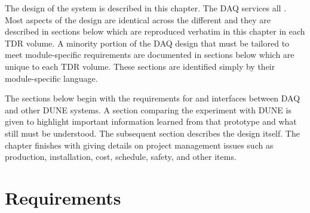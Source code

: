 The design of the    system is described in this chapter.  The DAQ services all  .  Most  aspects of the design are identical across the different  and they are described in sections below which are reproduced verbatim in this  chapter in each  TDR volume.  A minority portion of the DAQ design that must be tailored to meet module-specific requirements are documented in sections below which are unique to each  TDR volume.  These sections are identified simply by their module-specific language.

The sections below begin with the requirements for and interfaces between DAQ and other DUNE systems.  A section comparing the  experiment with DUNE is given to highlight important information learned from that prototype and what still must be understood.  The subsequent section describes the design itself.  The chapter finishes with giving details on project management issues such as production, installation, cost, schedule, safety, and other items.

\section{Requirements}
\label{sec:fd-daq:requirements}


